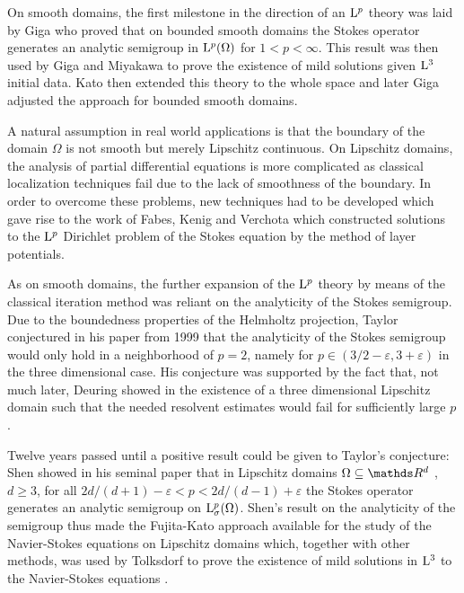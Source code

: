 On smooth domains, the first milestone in the direction of an $\mathrm{L}^p$ theory was laid by Giga \cite{giga} who proved that on bounded smooth domains the Stokes operator generates an analytic semigroup in $\mathrm{L}^p(\Omega)$ for $1 < p < \infty$.
This result was then used by Giga and Miyakawa \cite{gigaMiyakawa} to prove the existence of mild solutions given $\mathrm{L}^3$ initial data.
Kato \cite{katoExtend} then extended this theory to the whole space and later Giga \cite{gigaAdjust} adjusted the approach for bounded smooth domains.

A natural assumption in real world applications is that the boundary of the domain $\Omega$ is not smooth but merely Lipschitz continuous. 
On Lipschitz domains, the analysis of partial differential equations is more complicated as classical localization techniques fail due to the lack of smoothness of the boundary.
In order to overcome these problems, new techniques had to be developed which gave rise to the work of Fabes, Kenig and Verchota \cite{fabesKenigVerchota} which constructed solutions to the $\mathrm{L}^p$ Dirichlet problem of the Stokes equation by the method of layer potentials.

As on smooth domains, the further expansion of the $\mathrm{L}^p$ theory by means of the classical iteration method was reliant on the analyticity of the Stokes semigroup.
Due to the boundedness properties of the Helmholtz projection, Taylor conjectured in his paper \cite{taylor} from 1999 that the analyticity of the Stokes semigroup would only hold in a neighborhood of $p = 2$, namely for $p \in  (3/2 - \varepsilon, 3 + \varepsilon)$ in the three dimensional case.
His conjecture was supported by the fact that, not much later, Deuring showed in \cite{deuring} the existence of a three dimensional Lipschitz domain such that the needed resolvent estimates would fail for sufficiently large $p$.

Twelve years passed until a positive result could be given to Taylor's conjecture:  Shen showed in his seminal paper \cite{Shen2012} that in Lipschitz domains $\Omega \subseteq \R^d$ , $d \geq 3$, for all $2d/( d + 1) - \varepsilon < p < 2d/(d - 1) + \varepsilon$ the Stokes operator generates an analytic semigroup on $\mathrm{L}^p_\sigma(\Omega)$.
Shen's result on the analyticity of the semigroup thus made the Fujita-Kato approach available for the study of the Navier-Stokes equations on Lipschitz domains which, together with other methods, was used by Tolksdorf to prove the existence of mild solutions in $\mathrm{L}^3$ to the Navier-Stokes equations \cite{tolksdorf}.

